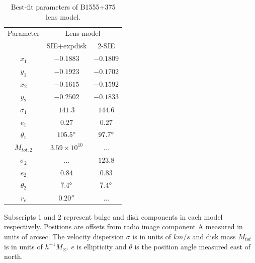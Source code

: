 \documentclass[useAMS,usenatbib]{mn2e}
\begin{document}
\begin{table}
  \caption{Best-fit parameters of B1555+375 lens model.}
  \begin{tabular}{@{}ccc}
\hline 
 Parameter  & \multicolumn{2}{c}{Lens model} \\
		&SIE+expdisk& 2-SIE		   
\\
\hline
$x_1$  	  & $-0.1883$	& $-0.1809$  \\
$y_1$	  &$-0.1923$	&$-0.1702$  \\
$x_2$	  &$-0.1615$ 	&$-0.1592$  \\
$y_2$	  &$-0.2502$	& $-0.1833$  \\
$\sigma_1$ &$141.3$     & $144.6$ \\
$e_1$	  & $0.27$	& $0.27$ \\
$\theta_1$ &$105.5 \hbox{$^\circ$}$ & $97.7 \hbox{$^\circ$}$ \\
$M_{tot,2}$  & $3.59\times 10^{10} $  & ...	 \\  
$\sigma_2$ & ...        &$123.8$ \\  
$e_2$	  &$0.84$	&$0.83$  \\
$\theta_2$ &$7.4\hbox{$^\circ$}$ &$7.4\hbox{$^\circ$}$  \\
$r_e$	  & $0.20 ''$ &  ... \\
\hline
\end{tabular}

\medskip
Subscripts 1 and 2 represent bulge and disk components in each model respectively. Positions are offsets from radio image component A measured in units of arcsec. The velocity dispersion $\sigma$ is in units of $km/s$ and disk mass $M_{tot}$ is in units of $h^{-1} M_{\odot}$. $e$ is ellipticity and $\theta$ is the position angle measured east of north.

\end{table}
\end{document}
